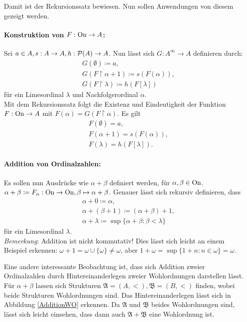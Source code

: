 Damit ist der Rekursionssatz bewiesen. Nun sollen Anwendungen von diesem gezeigt werden.

\paragraph{Konstruktion von $F:\operatorname{On} \to A$:}
Sei $a\in A,s:A\to A, h: \mathcal{P}(A)\to A$. Nun lässt sich $G:A^\infty\to A$ definieren durch: 
\begin{align*}
	&G(\emptyset)\coloneqq a,\\ 
	&G(F\upharpoonright\alpha+1)\coloneqq s(F(\alpha)),\\ 
	&G(F\upharpoonright\lambda)\coloneqq h(F[\lambda])
\end{align*}
für ein Limesordinal $\lambda$ und Nachfolgerordinal $\alpha$.\\
Mit dem Rekursionssatz folgt die Existenz und Eindeutigkeit der Funktion $F:\operatorname{On}\to A$ mit $F(\alpha)=G(F\upharpoonright\alpha)$. Es gilt \begin{align*}
	&F(\emptyset)=a,\\ &F(\alpha+1)=s(F(\alpha)),\\ &F(\lambda)=h(F[\lambda]).
\end{align*}

\paragraph{Addition von Ordinalzahlen:} 
Es sollen nun Ausdrücke wie $\alpha+\beta$ definiert werden, für $\alpha,\beta\in \operatorname{On}$. $\alpha+\beta\coloneqq F_\alpha:\operatorname{On}\to \operatorname{On}, \beta\mapsto\alpha+\beta$. 
Genauer lässt sich rekursiv definieren, dass 
\begin{align*}
	&\alpha+0\coloneqq\alpha,\\
	&\alpha+(\beta+1)\coloneqq(\alpha+\beta)+1,\\ 
	&\alpha+\lambda\coloneqq\sup\{\alpha+\beta : \beta < \lambda\}
\end{align*}
für ein Limesordinal $\lambda$.
\\
\textit{Bemerkung}: Addition ist nicht kommutativ! Dies lässt sich leicht an einem Beispiel erkennen: $\omega+1=\omega\cup\{\omega\}\neq\omega$, aber $1+\omega=\sup\{1+n:n\in\omega\}=\omega$.

Eine andere interessante Beobachtung ist, dass sich Addition zweier Ordinalzahlen durch \glqq Hintereinanderlegen\grqq{} zweier Wohlordnungen darstellen lässt. Für $\alpha+\beta$ lassen sich Strukturen $\mathfrak{A}=(A,<), \mathfrak{B}=(B,<)$ finden, wobei beide Strukturen Wohlordnungen sind. Das \glqq Hintereinanderlegen\grqq{} lässt sich in Abbildung \ref{AdditionWO} erkennen. Da $\mathfrak{A}$ und $\mathfrak{B}$ beides Wohlordnungen sind, lässt sich leicht einsehen, dass dann auch $\mathfrak{A}+\mathfrak{B}$ eine Wohlordnung ist.
	
